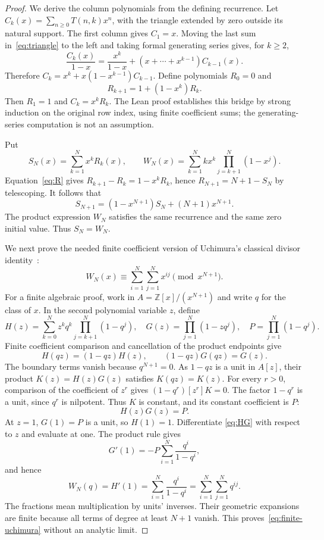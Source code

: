 \documentclass[11pt]{article}
\newcommand{\Z}{\mathbb Z}
\begin{document}
\begin{proof}
We derive the column polynomials from the defining recurrence.
Let $C_k(x)=\sum_{n\ge0}T(n,k)x^n$, with the triangle extended by zero
outside its natural support. The first column gives $C_1=x$.
Moving the last sum in~\eqref{eq:triangle} to the left and taking formal
generating series gives, for $k\ge2$,
\[
\frac{C_k(x)}{1-x}
=\frac{x^k}{1-x}+(x+\cdots+x^{k-1})C_{k-1}(x).
\]
Therefore $C_k=x^k+x(1-x^{k-1})C_{k-1}$.
Define polynomials $R_0=0$ and
\begin{equation}\label{eq:R}
R_{k+1}=1+(1-x^k)R_k.
\end{equation}
Then $R_1=1$ and $C_k=x^kR_k$. The Lean proof establishes this bridge
by strong induction on the original row index, using finite coefficient
sums; the generating-series computation is not an assumption.

Put
\[
S_N(x)=\sum_{k=1}^{N}x^kR_k(x),\qquad
W_N(x)=\sum_{k=1}^{N}k x^k\prod_{j=k+1}^{N}(1-x^j).
\]
Equation~\eqref{eq:R} gives $R_{k+1}-R_k=1-x^kR_k$, hence
$R_{N+1}=N+1-S_N$ by telescoping. It follows that
\[
S_{N+1}=(1-x^{N+1})S_N+(N+1)x^{N+1}.
\]
The product expression $W_N$ satisfies the same recurrence and the same
zero initial value. Thus $S_N=W_N$.

We next prove the needed finite coefficient version of Uchimura's
classical divisor identity~\cite{Uchimura,Bressoud}:
\begin{equation}\label{eq:finite-uchimura}
W_N(x)\equiv\sum_{i=1}^{N}\sum_{j=1}^{N}x^{ij}\pmod{x^{N+1}}.
\end{equation}
For a finite algebraic proof, work in
$A=\Z[x]/(x^{N+1})$ and write $q$ for the class of $x$.
In the second polynomial variable $z$, define
\[
H(z)=\sum_{k=0}^{N}z^kq^k\prod_{j=k+1}^{N}(1-q^j),
\quad
G(z)=\prod_{j=1}^{N}(1-zq^j),
\quad
P=\prod_{j=1}^{N}(1-q^j).
\]
Finite coefficient comparison and cancellation of the product endpoints
give
\[
H(qz)=(1-qz)H(z),\qquad (1-qz)G(qz)=G(z).
\]
The boundary terms vanish because $q^{N+1}=0$.
As $1-qz$ is a unit in $A[z]$, their product $K(z)=H(z)G(z)$ satisfies
$K(qz)=K(z)$. For every $r>0$, comparison of the coefficient of $z^r$
gives $(1-q^r)[z^r]K=0$. The factor $1-q^r$ is a unit, since $q^r$
is nilpotent. Thus $K$ is constant, and its constant coefficient is $P$:
\begin{equation}\label{eq:HG}
H(z)G(z)=P.
\end{equation}
At $z=1$, $G(1)=P$ is a unit, so $H(1)=1$. Differentiate
\eqref{eq:HG} with respect to $z$ and evaluate at one. The product rule
gives
\[
G'(1)=-P\sum_{i=1}^{N}\frac{q^i}{1-q^i},
\]
and hence
\[
W_N(q)=H'(1)=\sum_{i=1}^{N}\frac{q^i}{1-q^i}
             =\sum_{i=1}^{N}\sum_{j=1}^{N}q^{ij}.
\]
The fractions mean multiplication by units' inverses. Their geometric
expansions are finite because all terms of degree at least $N+1$ vanish.
This proves~\eqref{eq:finite-uchimura} without an analytic limit.


\end{proof}
\end{document}
